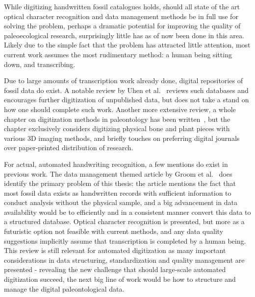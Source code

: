 \documentclass[english,twoside,openright]{UH_DS_MSc}
\begin{document}
While digitizing handwritten fossil catalogues holds,
should all state of the art optical character recognition and data management methods 
be in full use for solving the problem, perhaps a dramatic potential for improving 
the quality of paleoecological research, surprisingly little has as of now been done in this area.
Likely due to the simple fact that the problem has attracted little attention, 
most current work assumes the most rudimentary method: a human 
being sitting down, and transcribing.

Due to large amounts of transcription work already done, digital repositories of fossil data do exist. A notable review 
by Uhen et al.~\cite{uhenCardCatalogsComputers2013} reviews such databases and encourages further 
digitization of unpublished data, but does not take a stand on how one should complete such work.
Another more extensive review, a whole chapter on digitization methods in paleontology has been written~\cite{mallisonDigitizingMethodsPaleontology2011},
but the chapter exclusively considers digitizing physical bone and plant pieces with various 3D imaging methods, and briefly touches on preferring digital journals over 
paper-printed distribution of research.

For actual, automated handwriting recognition, a few mentions do exist in previous work. The data management themed 
article by Groom et al.~\cite{groomImprovedStandardizationTranscribed2019} does identify the primary 
problem of this thesis: the article mentions the fact that most fossil data exists as handwritten records with sufficient information 
to conduct analysis without the physical sample, and a big advancement in data availability would be to efficiently and in a consistent 
manner convert this data to a structured database. Optical character recognition is presented, but more as a futuristic option 
not feasible with current methods, and any data quality suggestions implicitly assume that transcription is completed 
by a human being. This review is still relevant for automated digitization as many important considerations in data structuring,
standardization and quality management are presented - revealing the new challenge that should large-scale automated digitization succeed,
the next big line of work would be how to structure and manage the digital paleontological data.
\end{document}
